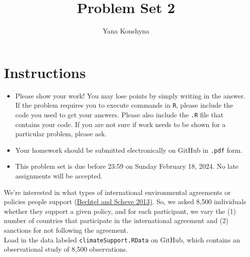 \documentclass[12pt,letterpaper]{article}
\title{Problem Set 2}
\author{Yana Konshyna}
\begin{document}
	\maketitle
	\section*{Instructions}
	\begin{itemize}
		\item Please show your work! You may lose points by simply writing in the answer. If the problem requires you to execute commands in \texttt{R}, please include the code you used to get your answers. Please also include the \texttt{.R} file that contains your code. If you are not sure if work needs to be shown for a particular problem, please ask.
		\item Your homework should be submitted electronically on GitHub in \texttt{.pdf} form.
		\item This problem set is due before 23:59 on Sunday February 18, 2024. No late assignments will be accepted.
	\end{itemize}

	
	

	\vspace{.25cm}
\noindent We're interested in what types of international environmental agreements or policies people support (\href{https://www.pnas.org/content/110/34/13763}{Bechtel and Scheve 2013)}. So, we asked 8,500 individuals whether they support a given policy, and for each participant, we vary the (1) number of countries that participate in the international agreement and (2) sanctions for not following the agreement. \\

\noindent Load in the data labeled \texttt{climateSupport.RData} on GitHub, which contains an observational study of 8,500 observations.
\end{document}
